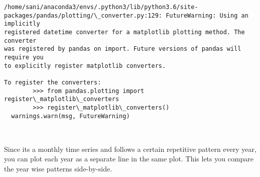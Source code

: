 \documentclass[11pt]{article}
\begin{document}
    \begin{Verbatim}[commandchars=\\\{\}]
/home/sani/anaconda3/envs/.python3/lib/python3.6/site-
packages/pandas/plotting/\_converter.py:129: FutureWarning: Using an implicitly
registered datetime converter for a matplotlib plotting method. The converter
was registered by pandas on import. Future versions of pandas will require you
to explicitly register matplotlib converters.

To register the converters:
        >>> from pandas.plotting import register\_matplotlib\_converters
        >>> register\_matplotlib\_converters()
  warnings.warn(msg, FutureWarning)
    \end{Verbatim}

    \begin{center}
    \end{center}
    { \hspace*{\fill} \\}
    
    Since its a monthly time series and follows a certain repetitive pattern
every year, you can plot each year as a separate line in the same plot.
This lets you compare the year wise patterns side-by-side.
\end{document}
